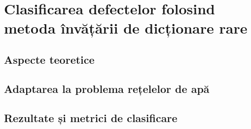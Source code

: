 \chapter{Clasificarea defectelor folosind metoda învățării de dicționare rare}
\label{chap:dictionary_learning}
\section{Aspecte teoretice}

\section{Adaptarea la problema rețelelor de apă}

\section{Rezultate și metrici de clasificare}
